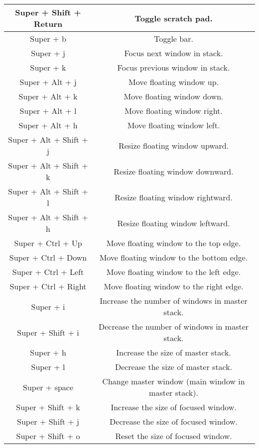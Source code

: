 \begin{longtable}{|c|c|}
    Super + Shift + Return & Toggle scratch pad. \\
    \hline
    Super + b & Toggle bar. \\
    \hline
    Super + j & Focus next window in stack. \\
    \hline
    Super + k & Focus previous window in stack. \\
    \hline
    Super + Alt + j & Move floating window up. \\
    \hline
    Super + Alt + k & Move floating window down. \\
    \hline
    Super + Alt + l & Move floating window right. \\
    \hline
    Super + Alt + h & Move floating window left. \\
    \hline
    Super + Alt + Shift + j & Resize floating window upward. \\
    \hline
    Super + Alt + Shift + k & Resize floating window downward. \\
    \hline
    Super + Alt + Shift + l & Resize floating window rightward. \\
    \hline
    Super + Alt + Shift + h & Resize floating window leftward. \\
    \hline
    Super + Ctrl + Up & Move floating window to the top edge. \\
    \hline
    Super + Ctrl + Down & Move floating window to the bottom edge. \\
    \hline
    Super + Ctrl + Left & Move floating window to the left edge. \\
    \hline
    Super + Ctrl + Right & Move floating window to the right edge. \\
    \hline
    Super + i & Increase the number of windows in master stack. \\
    \hline
    Super + Shift + i & Decrease the number of windows in master stack. \\
    \hline
    Super + h & Increase the size of master stack. \\
    \hline
    Super + l & Decrease the size of master stack. \\
    \hline
    Super + space & Change master window (main window in master stack). \\
    \hline
    Super + Shift + k & Increase the size of focused window. \\
    \hline
    Super + Shift + j & Decrease the size of focused window. \\
    \hline
    Super + Shift + o & Reset the size of focused window. \\

\end{longtable}
